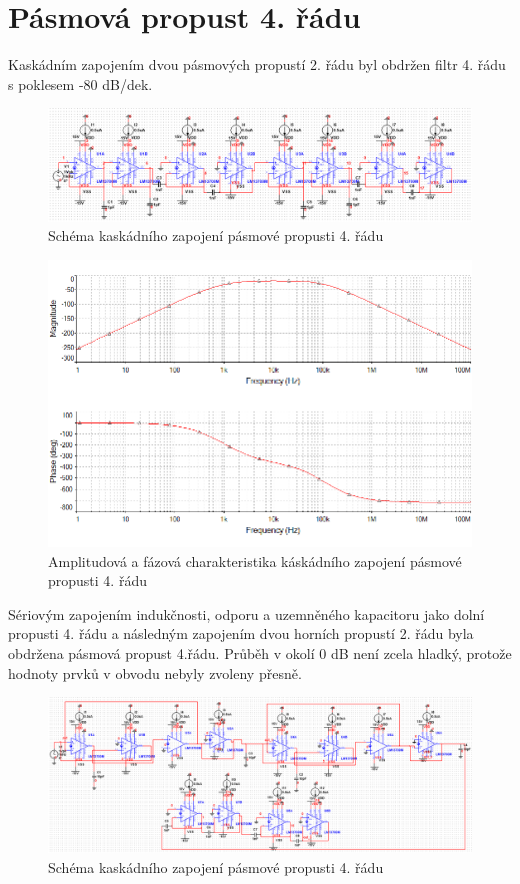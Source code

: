 \documentclass[twoside]{article}
\begin{document}
\section{Pásmová propust 4. řádu}
Kaskádním zapojením dvou pásmových propustí 2. řádu byl obdržen filtr 4. řádu s poklesem -80 dB/dek. 
\begin{figure}[H]
\centering
\includegraphics[scale=0.6]{kaskadnebandpass1.png}
\caption{Schéma kaskádního zapojení pásmové propusti 4. řádu}
\end{figure}
\begin{figure}[H]
\centering
\includegraphics[scale=0.75]{kaskadnebandpass.png}
\caption{Amplitudová a fázová charakteristika káskádního zapojení pásmové propusti 4. řádu}
\end{figure}
\noindent Sériovým zapojením indukčnosti, odporu a uzemněného kapacitoru jako dolní propusti 4. řádu a následným zapojením dvou horních propustí 2. řádu byla obdržena pásmová propust 4.řádu. Průběh v okolí 0 dB není zcela hladký, protože hodnoty prvků v obvodu nebyly zvoleny přesně.
\begin{figure}[H]
\centering
\includegraphics[scale=0.6]{lrcbandpass4.png}
\caption{Schéma kaskádního zapojení pásmové propusti 4. řádu}
\end{figure}
\end{document}
